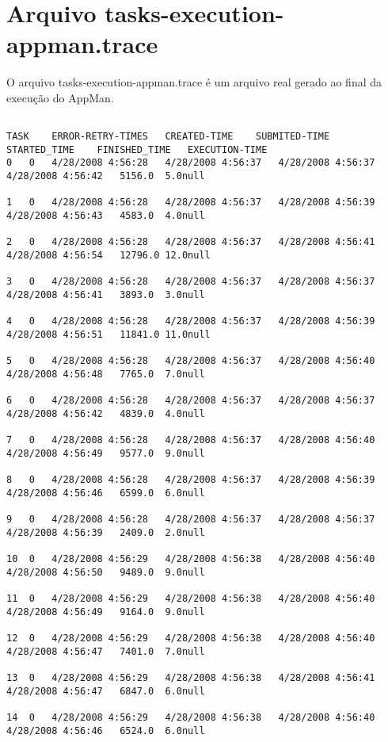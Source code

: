 \chapter{Arquivo tasks-execution-appman.trace}
\label{anexo:trace}

O arquivo tasks-execution-appman.trace é um arquivo real gerado ao final da execução do AppMan.

\begin{scriptsize}
\begin{verbatim}

TASK	ERROR-RETRY-TIMES	CREATED-TIME	SUBMITED-TIME	STARTED_TIME	FINISHED_TIME	EXECUTION-TIME
0	0	4/28/2008 4:56:28	4/28/2008 4:56:37	4/28/2008 4:56:37	4/28/2008 4:56:42	5156.0	5.0null

1	0	4/28/2008 4:56:28	4/28/2008 4:56:37	4/28/2008 4:56:39	4/28/2008 4:56:43	4583.0	4.0null

2	0	4/28/2008 4:56:28	4/28/2008 4:56:37	4/28/2008 4:56:41	4/28/2008 4:56:54	12796.0	12.0null

3	0	4/28/2008 4:56:28	4/28/2008 4:56:37	4/28/2008 4:56:37	4/28/2008 4:56:41	3893.0	3.0null

4	0	4/28/2008 4:56:28	4/28/2008 4:56:37	4/28/2008 4:56:39	4/28/2008 4:56:51	11841.0	11.0null

5	0	4/28/2008 4:56:28	4/28/2008 4:56:37	4/28/2008 4:56:40	4/28/2008 4:56:48	7765.0	7.0null

6	0	4/28/2008 4:56:28	4/28/2008 4:56:37	4/28/2008 4:56:37	4/28/2008 4:56:42	4839.0	4.0null

7	0	4/28/2008 4:56:28	4/28/2008 4:56:37	4/28/2008 4:56:40	4/28/2008 4:56:49	9577.0	9.0null

8	0	4/28/2008 4:56:28	4/28/2008 4:56:37	4/28/2008 4:56:39	4/28/2008 4:56:46	6599.0	6.0null

9	0	4/28/2008 4:56:28	4/28/2008 4:56:37	4/28/2008 4:56:37	4/28/2008 4:56:39	2409.0	2.0null

10	0	4/28/2008 4:56:29	4/28/2008 4:56:38	4/28/2008 4:56:40	4/28/2008 4:56:50	9489.0	9.0null

11	0	4/28/2008 4:56:29	4/28/2008 4:56:38	4/28/2008 4:56:40	4/28/2008 4:56:49	9164.0	9.0null

12	0	4/28/2008 4:56:29	4/28/2008 4:56:38	4/28/2008 4:56:40	4/28/2008 4:56:47	7401.0	7.0null

13	0	4/28/2008 4:56:29	4/28/2008 4:56:38	4/28/2008 4:56:41	4/28/2008 4:56:47	6847.0	6.0null

14	0	4/28/2008 4:56:29	4/28/2008 4:56:38	4/28/2008 4:56:40	4/28/2008 4:56:46	6524.0	6.0null


\end{verbatim}
\end{scriptsize}
